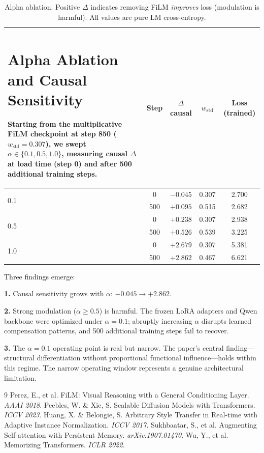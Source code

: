 \documentclass[11pt,a4paper]{article}
\begin{document}
\begin{table}[h]
\begin{tabular}{lcccc}
\section{Alpha Ablation and Causal Sensitivity}
\label{app:alpha}

Starting from the multiplicative FiLM checkpoint at step 850 ($w_\mathrm{std} =
0.307$), we swept $\alpha \in \{0.1, 0.5, 1.0\}$, measuring causal $\Delta$ at
load time (step 0) and after 500 additional training steps.

\begin{table}[h]
\centering
\begin{tabular}{lcccc}
\toprule
$\alpha$ & \textbf{Step} & $\Delta$ \textbf{causal} & $w_\mathrm{std}$ & \textbf{Loss (trained)} \\
\midrule
\multirow{2}{*}{0.1} & 0   & $-0.045$ & 0.307 & 2.700 \\
                     & 500 & $+0.095$ & 0.515 & 2.682 \\
\midrule
\multirow{2}{*}{0.5} & 0   & $+0.238$ & 0.307 & 2.938 \\
                     & 500 & $+0.526$ & 0.539 & 3.225 \\
\midrule
\multirow{2}{*}{1.0} & 0   & $+2.679$ & 0.307 & 5.381 \\
                     & 500 & $+2.862$ & 0.467 & 6.621 \\
\bottomrule
\end{tabular}
\caption{Alpha ablation. Positive $\Delta$ indicates removing FiLM \emph{improves}
loss (modulation is harmful). All values are pure LM cross-entropy.}
\end{table}

Three findings emerge:

\textbf{1.} Causal sensitivity grows with $\alpha$: $-0.045 \to +2.862$.

\textbf{2.} Strong modulation ($\alpha \geq 0.5$) is harmful. The frozen LoRA adapters and Qwen backbone were optimized under $\alpha = 0.1$; abruptly increasing $\alpha$ disrupts learned compensation patterns, and 500 additional training steps fail to recover.

\textbf{3.} The $\alpha = 0.1$ operating point is real but narrow. The paper's central finding---structural differentiation without proportional functional influence---holds within this regime. The narrow operating window represents a genuine architectural limitation.

\begin{thebibliography}{9}
 Perez, E., et al. FiLM: Visual Reasoning with a General Conditioning Layer. \textit{AAAI 2018}.
 Peebles, W. \& Xie, S. Scalable Diffusion Models with Transformers. \textit{ICCV 2023}.
 Huang, X. \& Belongie, S. Arbitrary Style Transfer in Real-time with Adaptive Instance Normalization. \textit{ICCV 2017}.
 Sukhbaatar, S., et al. Augmenting Self-attention with Persistent Memory. \textit{arXiv:1907.01470}.
 Wu, Y., et al. Memorizing Transformers. \textit{ICLR 2022}.
\end{thebibliography}
\end{document}
